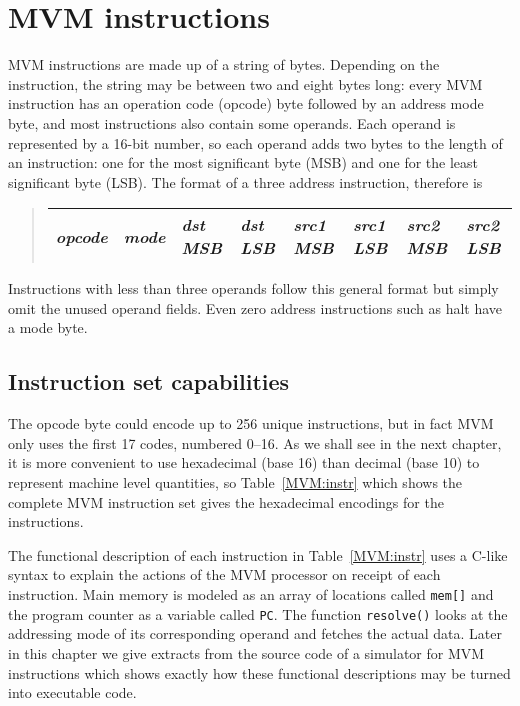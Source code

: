 \section{MVM instructions}

MVM instructions are made up of a string of bytes. Depending on the
instruction, the string may be between two and eight bytes long: every
MVM instruction has an operation code (opcode) byte followed by an
address mode byte, and most instructions also contain some operands.
Each operand is represented by a 16-bit number, so each operand adds two
bytes to the length of an instruction: one for the most significant byte
(MSB) and one for the least significant byte (LSB). The format of a
three address instruction, therefore is  \begin{quote}
\hspace*{-1.5cm}\begin{tabular}{|l|l|l|l|l|l|l|l|}  \hline \em
opcode&\em mode&\em dst MSB&\em dst LSB&\em src1 MSB&\em src1 LSB&\em
src2 MSB&\em src2 LSB\\ \hline \end{tabular} \end{quote}

Instructions with less than three operands follow this general format
but simply omit the unused operand fields. Even zero address
instructions such as {\sc halt} have a mode byte.

\subsection{Instruction set capabilities}
The opcode byte could encode up to 256 unique instructions, but in fact
MVM only uses the first 17 codes, numbered 0--16. As we shall see
in the next chapter, it is more convenient to use hexadecimal (base 16)
than decimal (base 10) to represent machine level quantities, so 
Table~\ref{MVM:instr} which shows the complete MVM instruction set gives
the hexadecimal encodings for the instructions.

The functional description of each instruction in Table~\ref{MVM:instr}
uses a C-like syntax to explain the actions of the MVM processor on
receipt of each instruction. Main memory is modeled as an array of
locations called {\tt mem[]} and the program counter as a variable
called {\tt PC}. The function {\tt resolve()} looks at the addressing
mode of its corresponding operand and fetches the actual data. Later in
this chapter we give extracts from  the source code of a simulator for
MVM instructions which shows exactly how these functional descriptions
may be turned into executable code.

